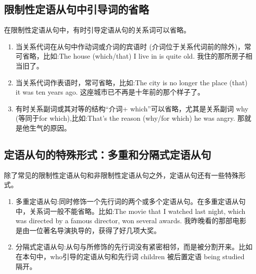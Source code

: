 \subsection{限制性定语从句中引导词的省略}

在限制性定语从句中，有时引导定语从句的关系词可以省略。
\begin{enumerate}
  \item 当关系代词在从句中作动词或介词的宾语时 (介词位于关系代词前的除外)，常可省略，比如:The house (which/that) I live in is quite old. 我住的那所房子相当旧了。
  \item 当关系代词作表语时，常可省略，比如:The city is no longer the place (that) it was ten years ago. 这座城市已不再是十年前的那个样子了。
  \item 有时关系副词或其对等的结构“介词+ which”可以省略，尤其是关系副词 why (等同于for which),比如:That's the reason (why/for which) he was angry. 那就是他生气的原因。
\end{enumerate}

\subsection{定语从句的特殊形式：多重和分隔式定语从句}

除了常见的限制性定语从句和非限制性定语从句之外，定语从句还有一些特殊形式。
\begin{enumerate}
  \item 多重定语从句:同时修饰一个先行词的两个或多个定语从句。在多重定语从句中，关系词一般不能省略。比如:The movie that I watched last night, which was directed by a famous director, won several awards. 我昨晚看的那部电影是由一位著名导演执导的，获得了好几项大奖。
  \item 分隔式定语从句:从句与所修饰的先行词没有紧密相邻，而是被分割开来。比如在本句中，who引导的定语从句和先行词 children 被后置定语 being studied 隔开。
\end{enumerate}




